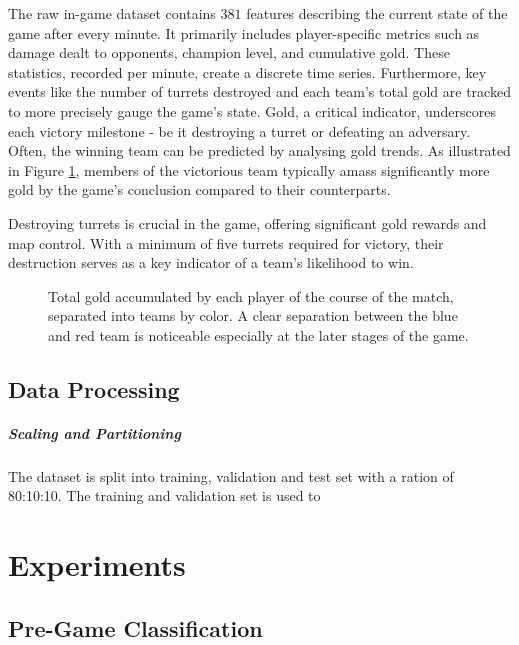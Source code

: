 \documentclass[12pt, a4paper, headinclude, twoside, plainheadsepline, open=right, numbers=noenddot, hidelinks, toc=listof, toc=bibliography]{scrreprt}
\begin{document}
The raw in-game dataset contains $381$ features describing the current state of the game after every minute.
It primarily includes player-specific metrics such as damage dealt to opponents, champion level, and cumulative gold. These statistics, recorded per minute, create a discrete time series. Furthermore, key events like the number of turrets destroyed and each team's total gold are tracked to more precisely gauge the game's state. Gold, a critical indicator, underscores each victory milestone - be it destroying a turret or defeating an adversary. Often, the winning team can be predicted by analysing gold trends. As illustrated in Figure \ref{fig:totalGold}, members of the victorious team typically amass significantly more gold by the game's conclusion compared to their counterparts.

Destroying turrets is crucial in the game, offering significant gold rewards and map control. 
With a minimum of five turrets required for victory, their destruction serves as a key indicator of a team's likelihood to win.

\begin{figure}

\caption{Total gold accumulated by each player of the course of the match, separated into teams by color. 
A clear separation between the blue and red team is noticeable especially at the later stages of the game.}
\label{fig:totalGold}
\end{figure}


\section{Data Processing}
\label{sec:data_processing}

\paragraph{Scaling and Partitioning}
The dataset is split into training, validation and test set with a ration of 80:10:10. 
The training and validation set is used to 





\chapter{Experiments}
\label{chap:experiments}




\section{Pre-Game Classification}
\label{sec:pregame_class}
\end{document}
